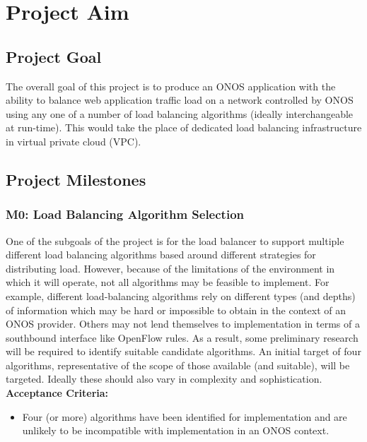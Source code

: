\section{Project Aim} \label{sec:aim}
\subsection{Project Goal}
The overall goal of this project is to produce an ONOS application with the ability to balance web application traffic load on a network controlled by ONOS using any one of a number of load balancing algorithms (ideally interchangeable at run-time). This would take the place of dedicated load balancing infrastructure in virtual private cloud (VPC).

\subsection{Project Milestones}

\subsubsection{M0: Load Balancing Algorithm Selection} \label{lba}
One of the subgoals of the project is for the load balancer to support multiple different load balancing algorithms based around different strategies for distributing load. However, because of the limitations of the environment in which it will operate, not all algorithms may be feasible to implement. For example, different load-balancing algorithms rely on different types (and depths) of information which may be hard or impossible to obtain in the context of an ONOS provider. Others may not lend themselves to implementation in terms of a southbound interface like OpenFlow rules. As a result, some preliminary research will be required to identify suitable candidate algorithms. An initial target of four algorithms, representative of the scope of those available (and suitable), will be targeted. Ideally these should also vary in complexity and sophistication. \\

\textbf{Acceptance Criteria:}
\begin{itemize}
    \item Four (or more) algorithms have been identified for implementation and are unlikely to be incompatible with implementation in an ONOS context.
\end{itemize}

